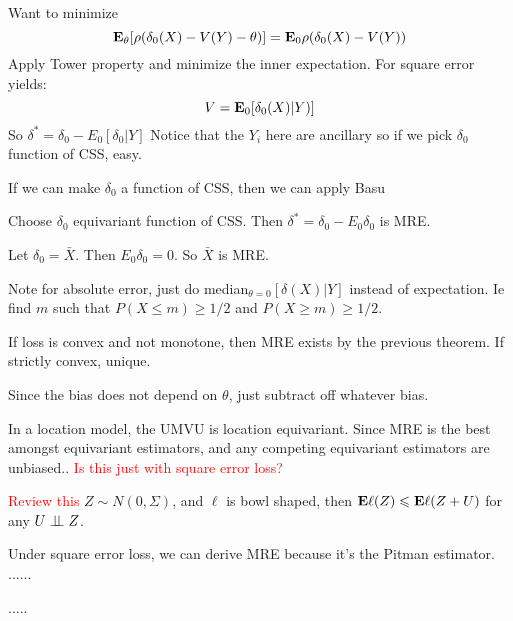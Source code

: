 \documentclass{article}
\newcommand\myworries[1]{\textcolor{red}{#1}}
\begin{document}
Want to minimize 
	$$\mathbf{E}_\theta [ \rho (\delta_0(X)- V(Y) - \theta)] = \mathbf{E}_0 \rho (\delta_0(X) - V(Y))$$
	Apply Tower property and minimize the inner expectation. For square error yields:
	$$V = \mathbf{E}_0 [\delta_0 (X) |Y)]$$
	So $\delta^* = \delta_0 - E_0 [\delta_0 |Y]$
Notice that the $Y_i$ here are ancillary so if we pick $\delta_0$ function of CSS, easy. 


If we can make $\delta_0$ a function of CSS, then we can apply Basu
\begin{recipe}
	Choose $\delta_0$ equivariant function of CSS. Then $\delta^* = \delta_0 - E_0 \delta_0$ is MRE. 
	\begin{example}
	Let $\delta_0 = \bar X$. Then $E_0 \delta_0 = 0$. So $\bar X$ is MRE.
\end{example}
\end{recipe}
Note for absolute error, just do median$_{\theta=0}[\delta(X)|Y]$ instead of expectation. Ie find $m$ such that $P(X\leq m) \geq 1/2$ and $P(X\geq m) \geq 1/2$. 

\begin{theorem}
If loss is convex and not monotone, then MRE exists by the previous theorem. If strictly convex, unique. 
\end{theorem}





\begin{fact}
Since the bias does not depend on $\theta$, just subtract off whatever bias. 
\end{fact}

\begin{fact}
In a location model, the UMVU is location equivariant. Since MRE is the best amongst equivariant estimators, and any competing equivariant estimators are unbiased..
\myworries{Is this just with square error loss?}

\end{fact}


\begin{theorem}
\myworries{Review this}
$Z\sim N(0,\Sigma)$, and $\ell$ is bowl shaped, then $\mathbf{E} \ell (Z) \leqslant \mathbf{E} \ell (Z+U)$ for any $U\perp \! \! \! \perp Z$. 
\end{theorem}

 \begin{definition}
 Under square error loss, we can derive MRE because it's the Pitman estimator. 
 ...... 
\end{definition}
\begin{theorem}
..... 
\end{theorem}
\end{document}
